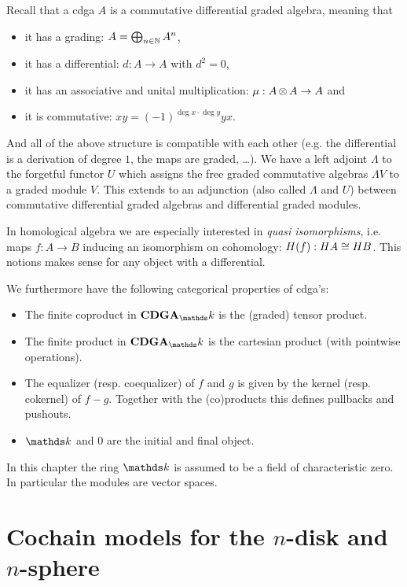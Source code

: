 

Recall that a cdga $A$ is a commutative differential graded algebra, meaning that
\begin{itemize}
	\item it has a grading: $A = \bigoplus_{n\in\mathbb{N}} A^n$,
	\item it has a differential: $d: A \to A$ with $d^2 = 0$,
	\item it has an associative and unital multiplication: $\mu: A \operatorname*{\otimes} A \to A$ and
	\item it is commutative: $x y = (-1)^{\deg{x}\cdot\deg{y}} y x$.
\end{itemize}
And all of the above structure is compatible with each other (e.g. the differential is a derivation of degree $1$, the maps are graded, \dots). We have a left adjoint $\Lambda$ to the forgetful functor $U$ which assigns the free graded commutative algebras $\Lambda V$ to a graded module $V$. This extends to an adjunction (also called $\Lambda$ and $U$) between commutative differential graded algebras and differential graded modules.

In homological algebra we are especially interested in \emph{quasi isomorphisms}, i.e. maps $f: A \to B$ inducing an isomorphism on cohomology: $H(f): HA \cong HB$. This notions makes sense for any object with a differential.

We furthermore have the following categorical properties of cdga's:
\begin{itemize}
	\item The finite coproduct in $\CDGA_\k$ is the (graded) tensor product.
	\item The finite product in $\CDGA_\k$ is the cartesian product (with pointwise operations).
	\item The equalizer (resp. coequalizer) of $f$ and $g$ is given by the kernel (resp. cokernel) of $f - g$. Together with the (co)products this defines pullbacks and pushouts.
	\item $\k$ and $0$ are the initial and final object.
\end{itemize}

In this chapter the ring $\k$ is assumed to be a field of characteristic zero. In particular the modules are vector spaces.


\section{Cochain models for the $n$-disk and $n$-sphere}


